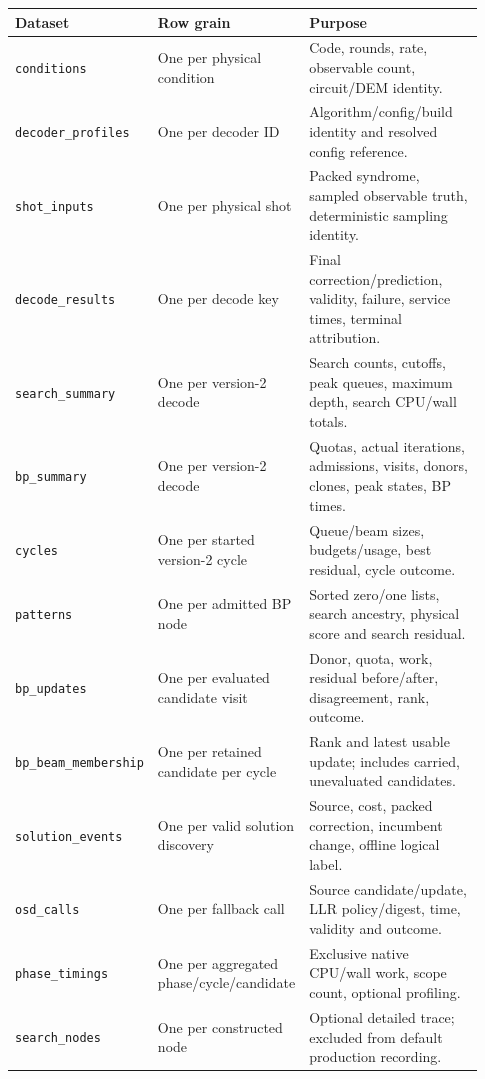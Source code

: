 \documentclass[11pt,a4paper]{article}
\newcommand{\code}[1]{\nolinkurl{#1}}
\begin{document}
\begin{longtable}{p{0.25\linewidth}p{0.28\linewidth}p{0.40\linewidth}}
\toprule Dataset & Row grain & Purpose\\\midrule\endhead
\code{conditions} & One per physical condition & Code, rounds, rate, observable count, circuit/DEM identity.\\
\code{decoder_profiles} & One per decoder ID & Algorithm/config/build identity and resolved config reference.\\
\code{shot_inputs} & One per physical shot & Packed syndrome, sampled observable truth, deterministic sampling identity.\\
\code{decode_results} & One per decode key & Final correction/prediction, validity, failure, service times, terminal attribution.\\
\code{search_summary} & One per version-2 decode & Search counts, cutoffs, peak queues, maximum depth, search CPU/wall totals.\\
\code{bp_summary} & One per version-2 decode & Quotas, actual iterations, admissions, visits, donors, clones, peak states, BP times.\\
\code{cycles} & One per started version-2 cycle & Queue/beam sizes, budgets/usage, best residual, cycle outcome.\\
\code{patterns} & One per admitted BP node & Sorted zero/one lists, search ancestry, physical score and search residual.\\
\code{bp_updates} & One per evaluated candidate visit & Donor, quota, work, residual before/after, disagreement, rank, outcome.\\
\code{bp_beam_membership} & One per retained candidate per cycle & Rank and latest usable update; includes carried, unevaluated candidates.\\
\code{solution_events} & One per valid solution discovery & Source, cost, packed correction, incumbent change, offline logical label.\\
\code{osd_calls} & One per fallback call & Source candidate/update, LLR policy/digest, time, validity and outcome.\\
\code{phase_timings} & One per aggregated phase/cycle/candidate & Exclusive native CPU/wall work, scope count, optional profiling.\\
\code{search_nodes} & One per constructed node & Optional detailed trace; excluded from default production recording.\\\bottomrule
\end{longtable}
\end{document}

